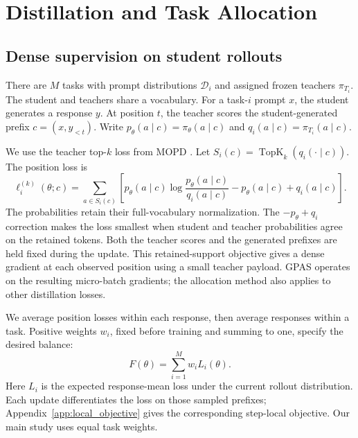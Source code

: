 \section{Distillation and Task Allocation}
\label{sec:setting}

\subsection{Dense supervision on student rollouts}

There are $M$ tasks with prompt distributions $\mathcal D_i$ and assigned
frozen teachers $\pi_{T_i}$. The student and teachers share a vocabulary.
For a task-$i$ prompt $x$, the student generates a response $y$. At position
$t$, the teacher scores the student-generated prefix $c=(x,y_{<t})$.
Write $p_\theta(a\mid c)=\pi_\theta(a\mid c)$ and
$q_i(a\mid c)=\pi_{T_i}(a\mid c)$.

We use the teacher top-$k$ loss from MOPD
\citep{ma2026mopdmultiteacheronpolicydistillation}. Let
$S_i(c)=\operatorname{TopK}_k(q_i(\cdot\mid c))$. The position loss is
\begin{equation}
    \ell_i^{(k)}(\theta;c)=
    \sum_{a\in S_i(c)}
    \left[
        p_\theta(a\mid c)\log\frac{p_\theta(a\mid c)}{q_i(a\mid c)}
        -p_\theta(a\mid c)+q_i(a\mid c)
    \right].
    \label{eq:dense_topk_loss}
\end{equation}
The probabilities retain their full-vocabulary normalization. The
$-p_\theta+q_i$ correction makes the loss smallest when student and teacher
probabilities agree on the retained tokens. Both the teacher scores and the
generated prefixes are held fixed during the update. This retained-support objective gives a dense gradient at each
observed position using a small teacher payload.
GPAS operates on the resulting micro-batch gradients; the allocation
method also applies to other distillation losses.

We average position losses within each response, then average responses
within a task. Positive weights $w_i$, fixed before training and summing
to one, specify the desired balance:
\begin{equation}
    F(\theta)=\sum_{i=1}^M w_iL_i(\theta).
    \label{eq:fixed_multitask_objective}
\end{equation}
Here $L_i$ is the expected response-mean loss under the current rollout
distribution. Each update differentiates the loss on those sampled prefixes;
Appendix~\ref{app:local_objective} gives the corresponding step-local
objective. Our main study uses equal task weights.

